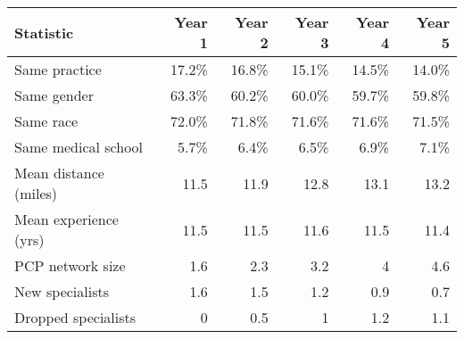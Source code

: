 \begin{table}[!h]
\centering
\begin{tabular}{lrrrrr}
\toprule
Statistic & Year 1 & Year 2 & Year 3 & Year 4 & Year 5\\
\midrule
Same practice & 17.2\% & 16.8\% & 15.1\% & 14.5\% & 14.0\%\\
Same gender & 63.3\% & 60.2\% & 60.0\% & 59.7\% & 59.8\%\\
Same race & 72.0\% & 71.8\% & 71.6\% & 71.6\% & 71.5\%\\
Same medical school & 5.7\% & 6.4\% & 6.5\% & 6.9\% & 7.1\%\\
Mean distance (miles) & 11.5 & 11.9 & 12.8 & 13.1 & 13.2\\
\addlinespace
Mean experience (yrs) & 11.5 & 11.5 & 11.6 & 11.5 & 11.4\\
PCP network size & 1.6 & 2.3 & 3.2 & 4 & 4.6\\
New specialists & 1.6 & 1.5 & 1.2 & 0.9 & 0.7\\
Dropped specialists & 0 & 0.5 & 1 & 1.2 & 1.1\\
\bottomrule
\end{tabular}
\end{table}
